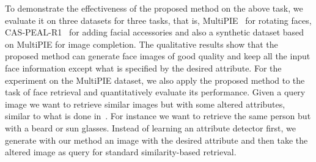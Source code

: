 \documentclass[10pt,twocolumn,letterpaper]{article}
\begin{document}
To demonstrate the effectiveness of the proposed method on the above task,
we evaluate it on three datasets for three tasks, that is, MultiPIE~\cite{multipie} for rotating faces, CAS-PEAL-R1~\cite{caspeal} for adding facial accessories and also a synthetic dataset based on MultiPIE for image completion.
The qualitative results show that the proposed method can generate face images of good quality and keep all the input face information except what is specified by the desired attribute.
For the experiment on the MultiPIE dataset, we also apply the proposed method to the task of face retrieval and quantitatively evaluate its performance.
Given a query image we want to retrieve similar images but with some altered attributes, similar to what is done in~\cite{Ghodrati-icmr15}.
For instance we want to retrieve the same person but with a beard or sun glasses.
Instead of learning an attribute detector first, we generate with our method an image with the desired attribute and then take the altered image as query for standard similarity-based retrieval.
\end{document}
